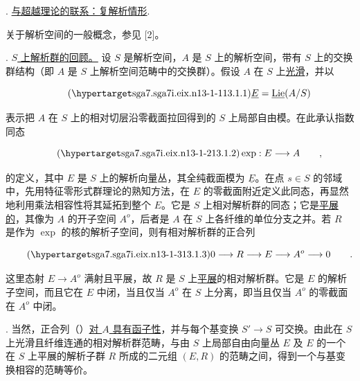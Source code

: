 \medskip
{}. \underline{与超越理论的联系：复解析情形}.

关于解析空间的一般概念，参见 [2]。

\medskip
\noindent
{}. \underline{$S$ 上解析群的回顾。} 设 $S$ 是解析空间，$A$ 是 $S$ 上的解析空间，带有 $S$ 上的交换群结构（即 $A$ 是 $S$ 上解析空间范畴中的交换群）。假设 $A$ 在 $S$ 上\underline{光滑}，并以

\begin{equation}\tag{\SGARefTarget{sga7.sga7i.eix.n13-1-1}{13.1.1}}
 \underline E=\underline{\operatorname{Lie}}(A/S)
\end{equation}

\noindent
表示把 $A$ 在 $S$ 上的相对切层沿零截面拉回得到的 $S$ 上局部自由模。在此承认指数同态

\begin{equation}\tag{\SGARefTarget{sga7.sga7i.eix.n13-1-2}{13.1.2}}
 \exp:E\longrightarrow A\qquad ,
\end{equation}

\noindent
的定义，其中 $E$ 是 $S$ 上的解析向量丛，其全纯截面模为 $\underline E$。在点 $s\in S$ 的邻域中，先用特征零形式群理论的熟知方法，在 $E$ 的零截面附近定义此同态，再显然地利用乘法相容性将其延拓到整个 $E$。它是 $S$ 上相对解析群的同态；它是\underline{平展的}，其像为 $A$ 的开子空间 $A^o$，后者是 $A$ 在 $S$ 上各纤维的单位分支之并。若 $R$ 是作为 $\exp$ 的核的解析子空间，则有相对解析群的正合列

\begin{equation}\tag{\SGARefTarget{sga7.sga7i.eix.n13-1-3}{13.1.3}}
 0\longrightarrow R\longrightarrow E\longrightarrow A^o
 \longrightarrow0\qquad .
\end{equation}

\noindent
这里态射 $E\longrightarrow A^o$ 满射且平展，故 $R$ 是 $S$ 上\underline{平展}的相对解析群。它是 $E$ 的解析子空间，而且它在 $E$ 中闭，当且仅当 $A^o$ 在 $S$ 上分离，即当且仅当 $A^o$ 的零截面在 $A^o$ 中闭。

\medskip
\noindent
{}. 当然，正合列（）\underline{对 $A$ 具有函子性}，并与每个基变换 $S'\longrightarrow S$ 可交换。由此在 $S$ 上光滑且纤维连通的相对解析群范畴，与由 $S$ 上局部自由向量丛 $E$ 及 $E$ 的一个在 $S$ 上平展的解析子群 $R$ 所成的二元组 $(E,R)$ 的范畴之间，得到一个与基变换相容的范畴等价。

